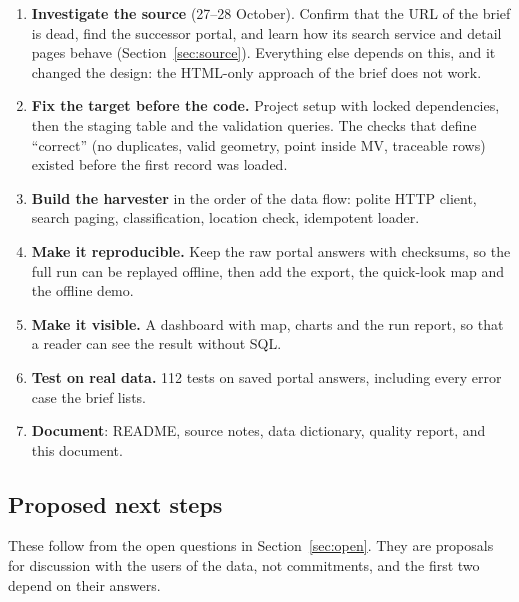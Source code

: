 \documentclass[11pt,a4paper]{article}
\begin{document}
\begin{enumerate}
\item \textbf{Investigate the source} (27--28 October). Confirm that the URL of the brief is dead, find the successor
  portal, and learn how its search service and detail pages behave (Section~\ref{sec:source}). Everything else depends
  on this, and it changed the design: the HTML-only approach of the brief does not work.
\item \textbf{Fix the target before the code.} Project setup with locked dependencies, then the staging table and the
  validation queries. The checks that define ``correct'' (no duplicates, valid geometry, point inside MV, traceable rows)
  existed before the first record was loaded.
\item \textbf{Build the harvester} in the order of the data flow: polite HTTP client, search paging, classification,
  location check, idempotent loader.
\item \textbf{Make it reproducible.} Keep the raw portal answers with checksums, so the full run can be replayed offline,
  then add the export, the quick-look map and the offline demo.
\item \textbf{Make it visible.} A dashboard with map, charts and the run report, so that a reader can see the result
  without SQL.
\item \textbf{Test on real data.} 112 tests on saved portal answers, including every error case the brief lists.
\item \textbf{Document}: README, source notes, data dictionary, quality report, and this document.
\end{enumerate}

\subsection{Proposed next steps}

These follow from the open questions in Section~\ref{sec:open}. They are proposals for discussion with the users of the
data, not commitments, and the first two depend on their answers.
\end{document}
